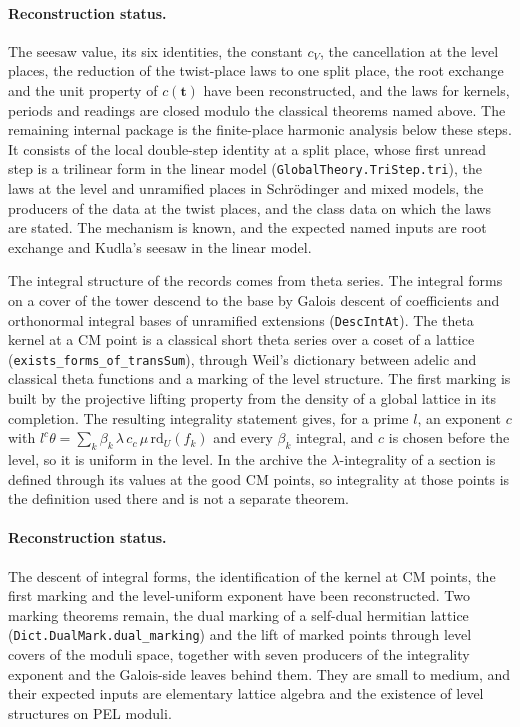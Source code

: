 \documentclass[11pt,letterpaper]{article}
\numberwithin{equation}{section}
\begin{document}
\paragraph{Reconstruction status.} The seesaw value, its six identities, the constant $c_V$, the cancellation at the level places, the reduction of the twist-place laws to one split place, the root exchange and the unit property of $c(\mathbf t)$ have been reconstructed, and the laws for kernels, periods and readings are closed modulo the classical theorems named above. The remaining internal package is the finite-place harmonic analysis below these steps. It consists of the local double-step identity at a split place, whose first unread step is a trilinear form in the linear model (\texttt{GlobalTheory.TriStep.tri}), the laws at the level and unramified places in Schr\"odinger and mixed models, the producers of the data at the twist places, and the class data on which the laws are stated. The mechanism is known, and the expected named inputs are root exchange and Kudla's seesaw in the linear model.

The integral structure of the records comes from theta series. The integral forms on a cover of the tower descend to the base by Galois descent of coefficients and orthonormal integral bases of unramified extensions (\texttt{DescIntAt}). The theta kernel at a CM point is a classical short theta series over a coset of a lattice (\texttt{exists\_forms\_of\_transSum}), through Weil's dictionary between adelic and classical theta functions and a marking of the level structure. The first marking is built by the projective lifting property from the density of a global lattice in its completion. The resulting integrality statement gives, for a prime $l$, an exponent $c$ with $l^c\theta=\sum_k\beta_k\,\lambda\,c_c\,\mu\,\mathrm{rd}_U(f_k)$ and every $\beta_k$ integral, and $c$ is chosen before the level, so it is uniform in the level. In the archive the $\lambda$-integrality of a section is defined through its values at the good CM points, so integrality at those points is the definition used there and is not a separate theorem.

\paragraph{Reconstruction status.} The descent of integral forms, the identification of the kernel at CM points, the first marking and the level-uniform exponent have been reconstructed. Two marking theorems remain, the dual marking of a self-dual hermitian lattice (\texttt{Dict.DualMark.dual\_marking}) and the lift of marked points through level covers of the moduli space, together with seven producers of the integrality exponent and the Galois-side leaves behind them. They are small to medium, and their expected inputs are elementary lattice algebra and the existence of level structures on PEL moduli.
\end{document}
